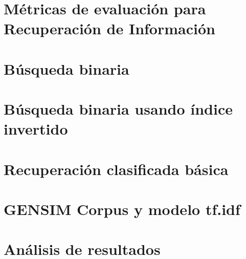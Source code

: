 \documentclass[12pt]{article}
\begin{document}
\thispagestyle{empty}
\tableofcontents
\pagebreak

\setcounter{page}{1}
\section{Métricas de evaluación para Recuperación de Información}

\section{Búsqueda binaria}

\section{Búsqueda binaria usando índice invertido}

\section{Recuperación clasificada básica}

\section{GENSIM Corpus y modelo tf.idf}

\section{Análisis de resultados}


\newpage


\end{document}
